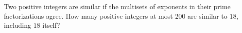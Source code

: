 Two positive integers are similar if the multisets of exponents in their prime factorizations agree. How many positive integers at most $200$ are similar to $18$, including $18$ itself?
